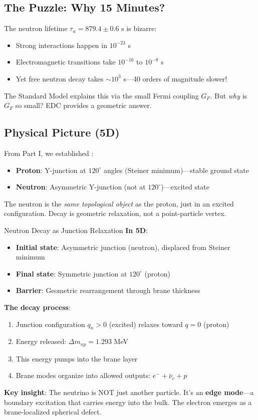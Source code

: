 \subsection{The Puzzle: Why 15 Minutes?}

The neutron lifetime $\tau_n = 879.4 \pm 0.6$ s \tagBL{} is bizarre:
\begin{itemize}[nosep]
\item Strong interactions happen in $10^{-23}$ s
\item Electromagnetic transitions take $10^{-16}$ to $10^{-8}$ s
\item Yet free neutron decay takes $\sim 10^3$ s---40 orders of magnitude slower!
\end{itemize}

The Standard Model explains this via the small Fermi coupling $G_F$. But \textit{why}
is $G_F$ so small? EDC provides a geometric answer.

\subsection{Physical Picture (5D)}

From Part I, we established \tagDer{}:
\begin{itemize}[nosep]
\item \textbf{Proton}: Y-junction at $120^\circ$ angles (Steiner minimum)---stable ground state
\item \textbf{Neutron}: Asymmetric Y-junction (not at $120^\circ$)---excited state
\end{itemize}

The neutron is the \textit{same topological object} as the proton, just in an
excited configuration. Decay is geometric relaxation, not a point-particle vertex.

\begin{mechanism}{Neutron Decay as Junction Relaxation}
\textbf{In 5D}:
\begin{itemize}[nosep]
\item \textbf{Initial state}: Asymmetric junction (neutron), displaced from Steiner minimum
\item \textbf{Final state}: Symmetric junction at $120^\circ$ (proton)
\item \textbf{Barrier}: Geometric rearrangement through brane thickness
\end{itemize}

\textbf{The decay process}:
\begin{enumerate}[nosep]
\item Junction configuration $q_n > 0$ (excited) relaxes toward $q = 0$ (proton)
\item Energy released: $\Delta m_{np} = 1.293$ MeV \tagBL{}
\item This energy pumps into the brane layer
\item Brane modes organize into allowed outputs: $e^- + \bar{\nu}_e + p$
\end{enumerate}

\textbf{Key insight}: The neutrino is NOT just another particle.
It's an \textbf{edge mode}---a boundary excitation that carries energy into the bulk.
The electron emerges as a brane-localized spherical defect.
\end{mechanism}

